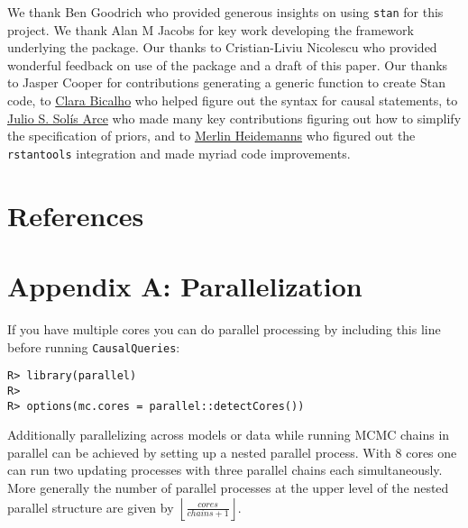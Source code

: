\documentclass[
  11pt,
  article]{jss}
\begin{document}
\begin{tcolorbox}[enhanced jigsaw, left=2mm, leftrule=.75mm, breakable, opacityback=0, colback=white, arc=.35mm, toprule=.15mm, rightrule=.15mm, bottomrule=.15mm]

We thank Ben Goodrich who provided generous insights on using
\texttt{stan} for this project. We thank Alan M Jacobs for key work
developing the framework underlying the package. Our thanks to
Cristian-Liviu Nicolescu who provided wonderful feedback on use of the
package and a draft of this paper. Our thanks to Jasper Cooper for
contributions generating a generic function to create Stan code, to
\href{https://clarabicalho.github.io/}{Clara Bicalho} who helped figure
out the syntax for causal statements, to
\href{https://www.gov.harvard.edu/directory/julio-s-solis-arce/}{Julio
S. Solís Arce} who made many key contributions figuring out how to
simplify the specification of priors, and to
\href{https://merlinheidemanns.github.io/website/}{Merlin Heidemanns}
who figured out the \texttt{rstantools} integration and made myriad code
improvements.

\end{tcolorbox}

\hypertarget{references}{%
\section*{References}\label{references}}

\renewcommand{\bibsection}{}


\newpage{}

\hypertarget{sec-parallel}{%
\section*{Appendix A: Parallelization}\label{sec-parallel}}

If you have multiple cores you can do parallel processing by including
this line before running \texttt{CausalQueries}:

\begin{verbatim}
R> library(parallel)
R> 
R> options(mc.cores = parallel::detectCores())
\end{verbatim}

Additionally parallelizing across models or data while running MCMC
chains in parallel can be achieved by setting up a nested parallel
process. With 8 cores one can run two updating processes with three
parallel chains each simultaneously. More generally the number of
parallel processes at the upper level of the nested parallel structure
are given by \(\left \lfloor \frac{cores}{chains + 1} \right \rfloor\).
\end{document}
